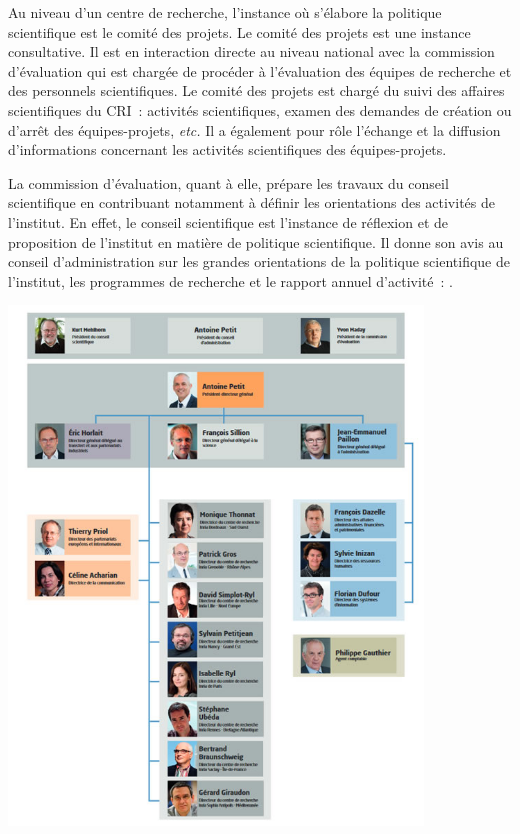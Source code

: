 Au niveau d'un centre de recherche,
l'instance o\`u s'\'elabore la politique scientifique est le
comit\'e des projets.
Le comit\'e des projets est une instance consultative. Il est en
interaction directe au niveau national avec la commission
d'\'evaluation qui est charg\'ee de proc\'eder \`a l'\'evaluation
des \'equipes de recherche et des personnels scientifiques. Le
comit\'e des projets est charg\'e du suivi des affaires
scientifiques du CRI~: activit\'es scientifiques, examen des demandes
de cr\'eation ou d'arr\^et des \'equipes-projets,
{\em etc.} Il a \'egalement pour r\^ole l'\'echange et la diffusion
d'informations concernant les activit\'es scientifiques des
\'equipes-projets.

La commission d'\'evaluation, quant \`a elle, pr\'epare
les travaux du conseil scientifique en contribuant notamment \`a
d\'efinir les orientations des activit\'es de l'institut. En effet,
le conseil scientifique est l'instance de r\'eflexion et de
proposition de l'institut en mati\`ere de politique scientifique. Il
donne son avis au conseil d'administration sur les grandes
orientations de la politique scientifique de l'institut, les
programmes de recherche et le rapport annuel d'activit\'e~:
.

\begin{center}
\includegraphics[width=11cm]{Images/organigramme-inria-2016.jpg}
\end{center}

